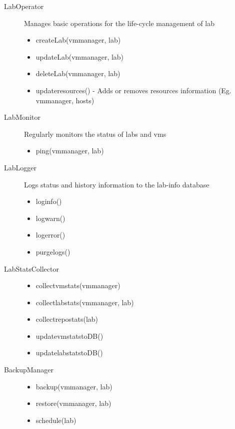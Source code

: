 \documentclass[11pt]{article}
\begin{document}
\begin{description}
\item [LabOperator] Manages basic operations for the life-cycle management of lab

\begin{itemize}
\item createLab(vmmanager, lab)
\item updateLab(vmmanager, lab)
\item deleteLab(vmmanager, lab)
\item updateresources() - Adds or removes resources information (Eg. vmmanager, hosts)
\end{itemize}

\item [LabMonitor] Regularly monitors the status of labs and vms

\begin{itemize}
\item ping(vmmanager, lab)
\end{itemize}

\item [LabLogger]  Logs status and history information to the lab-info database

\begin{itemize}
\item loginfo()
\item logwarn()
\item logerror()
\item purgelogs()
\end{itemize}

\item [LabStatsCollector]

\begin{itemize}
\item collectvmstats(vmmanager)
\item collectlabstats(vmmanager, lab)
\item collectrepostats(lab)
\item updatevmstatstoDB()
\item updatelabstatstoDB()
\end{itemize}

\item [BackupManager]

\begin{itemize}
\item backup(vmmanager, lab)
\item restore(vmmanager, lab)
\item schedule(lab)
\end{itemize}

\end{description}
\end{document}
